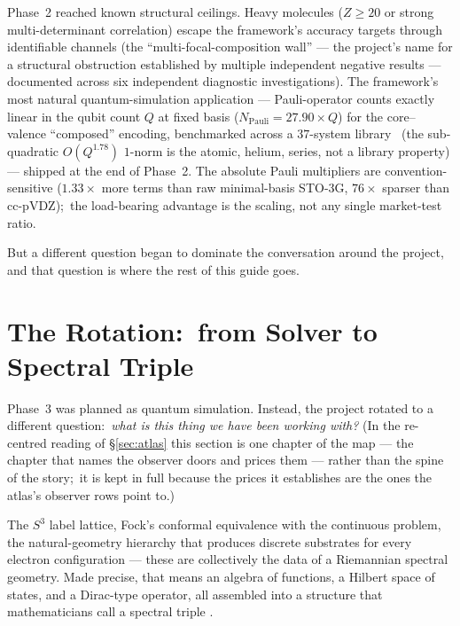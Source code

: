 \documentclass[11pt,a4paper]{article}
\newcommand{\sthree}{S^{3}}
\begin{document}
Phase~2 reached known structural ceilings.  Heavy molecules
($Z \ge 20$ or strong multi-determinant correlation) escape the
framework's accuracy targets through identifiable channels (the
``multi-focal-composition wall'' --- the project's name for a
structural obstruction established by multiple independent negative
results --- documented across six independent diagnostic
investigations).  The framework's most natural quantum-simulation
application --- Pauli-operator counts exactly linear in the qubit
count $Q$ at fixed basis ($N_{\mathrm{Pauli}} = 27.90 \times Q$) for
the core--valence ``composed'' encoding, benchmarked across a $37$-system
library~\cite{loutey_paper14} (the sub-quadratic $O(Q^{1.78})$ $1$-norm is
the atomic, helium, series, not a library property) --- shipped at the end
of Phase~2.  The
absolute Pauli multipliers are convention-sensitive ($1.33\times$ more
terms than raw minimal-basis STO-3G, $76\times$ sparser than cc-pVDZ);\ the
load-bearing advantage is the scaling, not any single market-test
ratio.

But a different question began to dominate the conversation around the
project, and that question is where the rest of this guide goes.

\section{The Rotation:\ from Solver to Spectral Triple}
\label{sec:rotation}

Phase~3 was planned as quantum simulation.  Instead, the project
rotated to a different question:\ \emph{what is this thing we have
been working with?}  (In the re-centred reading of \S\ref{sec:atlas}
this section is one chapter of the map --- the chapter that names the
observer doors and prices them --- rather than the spine of the story;\
it is kept in full because the prices it establishes are the ones the
atlas's observer rows point to.)

The $\sthree$ label lattice, Fock's conformal equivalence with the
continuous problem, the natural-geometry hierarchy that produces
discrete substrates for every electron configuration --- these are
collectively the data of a Riemannian spectral
geometry.  Made precise, that means an algebra of functions, a
Hilbert space of states, and a Dirac-type operator, all assembled
into a structure that mathematicians call a spectral triple
\cite{connes1994}.
\end{document}
